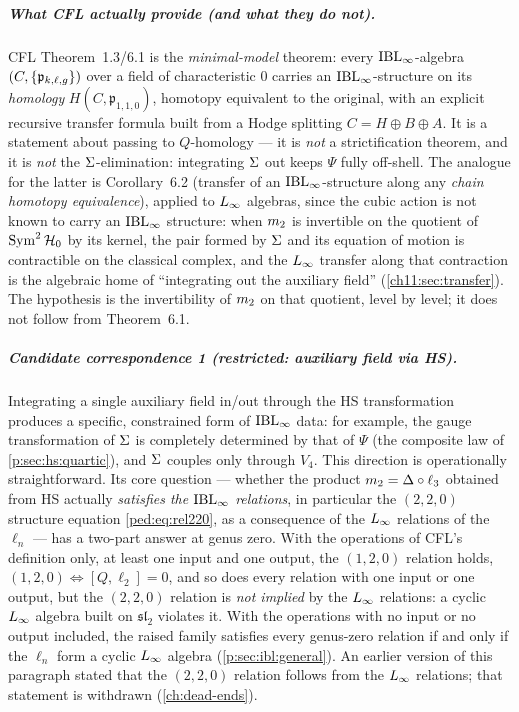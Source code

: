 \subparagraph{What CFL actually provide (and what they do not).} CFL Theorem~1.3/6.1
\cite{Cieliebak:2015:HomologicalAlgebraRelated} is the \emph{minimal-model} theorem: every $\mathrm{IBL}_\infty$-algebra
$(C,\{\mathfrak{p}_{k,\ell,g}\})$ over a field of characteristic $0$ carries an $\mathrm{IBL}_\infty$-structure on its
\emph{homology} $H(C,\mathfrak p_{1,1,0})$, homotopy equivalent to the original, with an
explicit recursive transfer formula built from a Hodge splitting $C=H\oplus B\oplus A$.
It is a statement about passing to $Q$-homology --- it is \emph{not} a strictification
theorem, and it is \emph{not} the $\Sigma$-elimination: integrating $\Sigma$ out keeps $\Psi$
fully off-shell. The analogue for the latter is Corollary~6.2 (transfer of an
$\mathrm{IBL}_\infty$-structure along any \emph{chain homotopy equivalence}), applied to $L_\infty$ algebras, since the cubic action is not known to carry an $\mathrm{IBL}_\infty$ structure: when $m_2$ is invertible
on the quotient of $\operatorname{Sym}^2\mathcal{H}_0$ by its kernel, the pair formed by $\Sigma$ and its equation of motion is contractible on the classical complex, and
the $L_\infty$ transfer along that contraction is the algebraic home of \enquote{integrating out the auxiliary
field} (\cref{ch11:sec:transfer}). The hypothesis is the invertibility of $m_2$ on that quotient, level by level; it does not follow from Theorem~6.1.

\subparagraph{Candidate correspondence 1 (restricted: auxiliary field via HS).} Integrating
a single auxiliary field in/out through the HS transformation produces a specific,
constrained form of $\mathrm{IBL}_\infty$ data: for example, the gauge transformation of $\Sigma$ is
completely determined by that of $\Psi$ (the composite law of
\cref{p:sec:hs:quartic}), and $\Sigma$ couples only through $V_4$. This direction is operationally
straightforward. Its core question --- whether the product $m_2=\Delta\circ\ell_3$
obtained from HS actually \emph{satisfies the $\mathrm{IBL}_\infty$ relations}, in particular the
$(2,2,0)$ structure equation \eqref{ped:eq:rel220}, as a consequence of the $L_\infty$ relations
of the $\ell_n$ --- has a two-part answer at genus zero.
With the operations of CFL's definition only, at least one input and one output, the $(1,2,0)$ relation holds, $(1,2,0)\Leftrightarrow[Q,\ell_2]=0$, and so does every relation with one input or one output, but the $(2,2,0)$ relation is \emph{not implied} by the $L_\infty$ relations: a cyclic $L_\infty$ algebra built on $\mathfrak{sl}_2$ violates it.
With the operations with no input or no output included, the raised family satisfies every genus-zero relation if and only if the $\ell_n$ form a cyclic $L_\infty$ algebra (\cref{p:sec:ibl:general}).
An earlier version of this paragraph stated that the $(2,2,0)$ relation follows from the $L_\infty$ relations; that statement is withdrawn (\cref{ch:dead-ends}).

